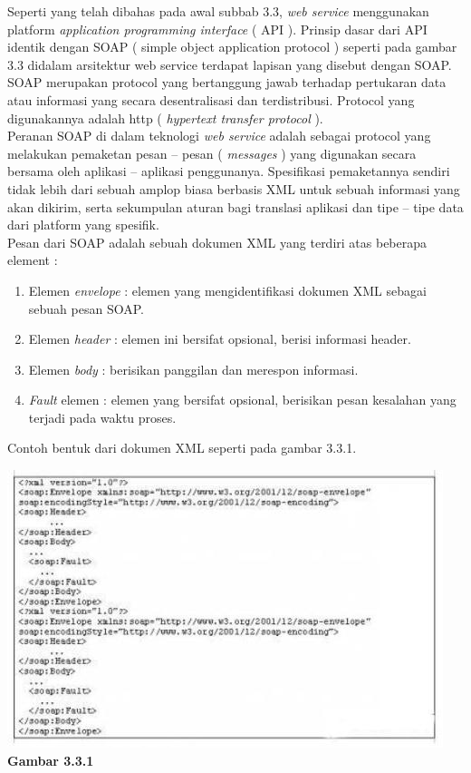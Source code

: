 \tab Seperti yang telah dibahas pada awal subbab 3.3, \textit{web service} menggunakan platform \textit{application programming interface} ( API ). Prinsip dasar dari API identik dengan SOAP ( simple object application protocol ) seperti pada gambar 3.3 didalam arsitektur web service terdapat lapisan yang disebut dengan SOAP.\\
\tab SOAP merupakan protocol yang bertanggung jawab terhadap pertukaran data atau informasi yang secara desentralisasi dan terdistribusi. Protocol yang digunakannya adalah http ( \textit{hypertext transfer protocol} ).\\
\tab Peranan SOAP di dalam teknologi \textit{web service} adalah sebagai protocol yang melakukan pemaketan pesan – pesan ( \textit{messages} ) yang digunakan secara bersama oleh aplikasi – aplikasi penggunanya. Spesifikasi pemaketannya sendiri tidak lebih dari sebuah amplop biasa berbasis XML untuk sebuah informasi yang akan dikirim, serta sekumpulan aturan bagi translasi aplikasi dan tipe – tipe data dari platform yang spesifik.\\
\tab Pesan dari SOAP adalah sebuah dokumen XML yang terdiri atas beberapa element :\\
\begin{enumerate}
\item Elemen \textit{envelope} : elemen yang mengidentifikasi dokumen XML sebagai sebuah pesan SOAP.
\item Elemen \textit{header} : elemen ini bersifat opsional, berisi informasi header.
\item Elemen \textit{body} : berisikan panggilan dan merespon informasi.
\item \textit{Fault} elemen : elemen yang bersifat opsional, berisikan pesan kesalahan yang terjadi pada waktu proses.

\end{enumerate}
Contoh bentuk dari dokumen XML seperti pada gambar 3.3.1.\\
\begin{center}
\includegraphics[scale=1]{Gambar331.jpg}\\
\textbf{Gambar 3.3.1}
\end{center}
